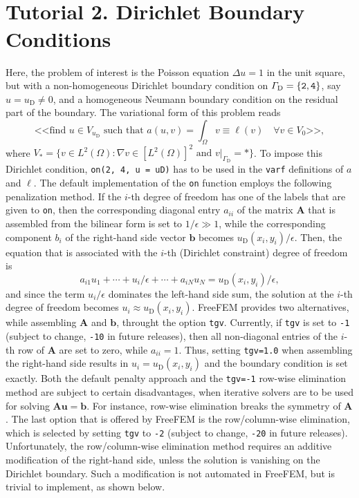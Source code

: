 \documentclass[9pt]{amsart}
\theoremstyle{remark}
\theoremstyle{definition}
\begin{document}
\section{\hrulefill\\Tutorial 2. Dirichlet Boundary Conditions}
Here, the problem of interest is the Poisson equation $\Delta u = 1$ in the unit square, but with a non-homogeneous Dirichlet boundary condition on $\varGamma_\mathrm{D}=\{\verb!2!,\verb!4!\}$, say $u=u_\mathrm{D}\neq 0$, and a homogeneous Neumann boundary condition on the residual part of the boundary. The variational form of this problem reads
\[
\text{<<find $u\in V_{u_\mathrm{D}}$ such that }a(u,v)=\int_\varOmega v\equiv\ell(v)\quad\forall v\in V_0\text{>>},
\]
where $V_\ast=\{v\in L^2(\varOmega):\nabla v\in [L^2(\varOmega)]^2\text{ and }v|_{\varGamma_\mathrm{D}}=\ast\}$. To impose this Dirichlet condition, \verb!on(2, 4, u = uD)! has to be used in the \verb!varf! definitions of $a$ and $\ell$. The default implementation of the \verb!on! function employs the following penalization method. If the $i$-th degree of freedom has one of the labels that are given to \verb!on!, then the corresponding diagonal entry $a_{ii}$ of the matrix $\bm{A}$ that is assembled from the bilinear form is set to $1/\epsilon\gg 1$, while the corresponding component $b_i$ of the right-hand side vector $\bm{b}$ becomes $u_\mathrm{D}(x_i,y_i)/\epsilon$. Then, the equation that is associated with the $i$-th (Dirichlet constraint) degree of freedom is
\[
a_{i1} u_1 + \cdots + u_i/\epsilon + \cdots + a_{iN} u_N = u_\mathrm{D}(x_i,y_i)/\epsilon,
\]
and since the term $u_i/\epsilon$ dominates the left-hand side sum, the solution at the $i$-th degree of freedom becomes $u_i\approx u_\mathrm{D}(x_i,y_i)$. FreeFEM provides two alternatives, while assembling $\bm{A}$ and $\bm{b}$, throught the option \verb!tgv!. Currently, if \verb!tgv! is set to \verb!-1! (subject to change, \verb!-10! in future releases), then all non-diagonal entries of the $i$-th row of $\bm{A}$ are set to zero, while $a_{ii}=1$. Thus, setting \verb!tgv=1.0! when assembling the right-hand side results in $u_i=u_\mathrm{D}(x_i,y_i)$ and the boundary condition is set exactly. Both the default penalty approach and the \verb!tgv=-1! row-wise elimination method are subject to certain disadvantages, when iterative solvers are to be used for solving $\bm{Au}=\bm{b}$. For instance, row-wise elimination breaks the symmetry of $\bm{A}$. The last option that is offered by FreeFEM is the row/column-wise elimination, which is selected by setting \verb!tgv! to \verb!-2! (subject to change, \verb!-20! in future releases). Unfortunately, the row/column-wise elimination method requires an additive modification of the right-hand side, unless the solution is vanishing on the Dirichlet boundary. Such a modification is not automated in FreeFEM, but is trivial to implement, as shown below.
\end{document}

